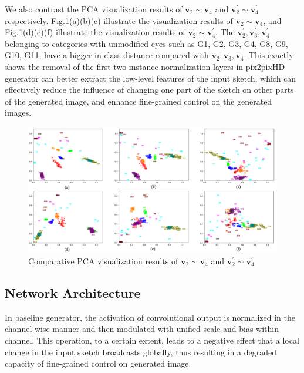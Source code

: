 \documentclass[10pt,twocolumn,letterpaper]{article}
\begin{document}
We also contrast the PCA visualization results of $\boldsymbol{v}_2 \sim \boldsymbol{v}_4$ and $\boldsymbol{v}_2^{'} \sim \boldsymbol{v}_4^{'}$ respectively. 
Fig.\ref{fig:pca_4}(a)(b)(c) illustrate the visualization results of $\boldsymbol{v}_2 \sim \boldsymbol{v}_4$, and Fig.\ref{fig:pca_4}(d)(e)(f) illustrate the visualization results of $\boldsymbol{v}_2^{'} \sim \boldsymbol{v}_4^{'}$. 
The $\boldsymbol{v}_2^{'}, \boldsymbol{v}_3^{'}, \boldsymbol{v}_4^{'}$ belonging to categories with unmodified eyes such as G1, G2, G3, G4, G8, G9, G10, G11, have a bigger in-class distance compared with $\boldsymbol{v}_2, \boldsymbol{v}_3, \boldsymbol{v}_4$. 
This exactly shows the removal of the first two instance normalization layers in pix2pixHD generator can better extract the low-level features of the input sketch, which can effectively reduce the influence of changing one part of the sketch on other parts of the generated image, and enhance fine-grained control on the generated images.
\begin{figure}[htb]
	\centering
	\includegraphics[width=0.8 \textwidth]{pca_4.png}
	\caption{Comparative PCA visualization results of $\boldsymbol{v}_2 \sim \boldsymbol{v}_4$ and $\boldsymbol{v}_2^{'} \sim \boldsymbol{v}_4^{'}$}
	\label{fig:pca_4}
\end{figure}


\subsection{Network Architecture}\label{sec:network}
In baseline generator, the activation of convolutional output is normalized in the channel-wise manner and then modulated with unified scale and bias within channel. 
This operation, to a certain extent, leads to a negative effect that a local change in the input sketch broadcasts globally, thus resulting in a degraded capacity of fine-grained control on generated image.
 
\end{document}
